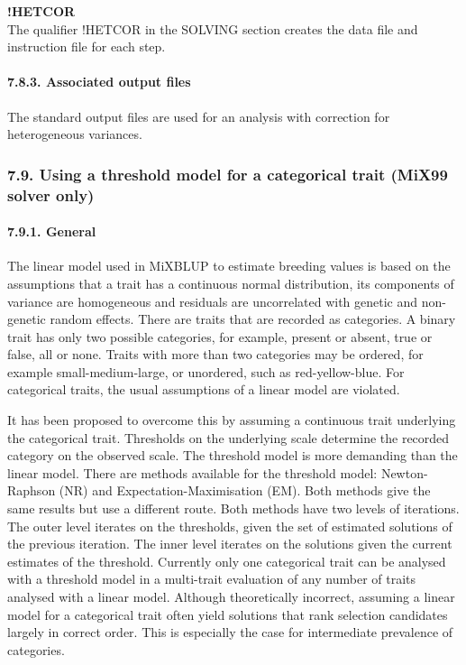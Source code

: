 \textbf{!HETCOR}\\
The qualifier !HETCOR in the SOLVING section creates the data file and
instruction file for each step.

\paragraph{7.8.3. Associated output files}\label{Stat40}

The standard output files are used for an analysis with correction for
heterogeneous variances.

\subsubsection{7.9. Using a threshold model for a categorical trait
(MiX99 solver only)}\label{Stat41}

\paragraph{7.9.1. General}\label{Stat42}

The linear model used in MiXBLUP to estimate breeding values is based on
the assumptions that a trait has a continuous normal distribution, its
components of variance are homogeneous and residuals are uncorrelated
with genetic and non-genetic random effects. There are traits that are
recorded as categories. A binary trait has only two possible categories,
for example, present or absent, true or false, all or none. Traits with
more than two categories may be ordered, for example small-medium-large,
or unordered, such as red-yellow-blue. For categorical traits, the usual
assumptions of a linear model are violated.

It has been proposed to overcome this by assuming a continuous trait
underlying the categorical trait. Thresholds on the underlying scale
determine the recorded category on the observed scale. The threshold
model is more demanding than the linear model. There are methods
available for the threshold model: Newton-Raphson (NR) and
Expectation-Maximisation (EM). Both methods give the same results but
use a different route. Both methods have two levels of iterations. The
outer level iterates on the thresholds, given the set of estimated
solutions of the previous iteration. The inner level iterates on the
solutions given the current estimates of the threshold. Currently only
one categorical trait can be analysed with a threshold model in a
multi-trait evaluation of any number of traits analysed with a linear
model. Although theoretically incorrect, assuming a linear model for a
categorical trait often yield solutions that rank selection candidates
largely in correct order. This is especially the case for intermediate
prevalence of categories.

